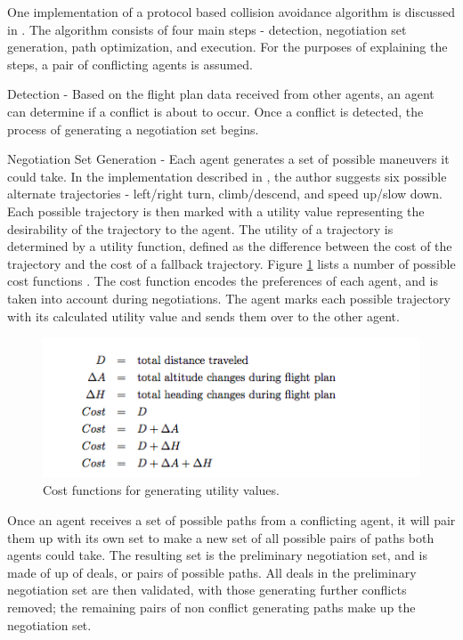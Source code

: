 \documentclass[conference]{IEEEtran}
\begin{document}
One implementation of a protocol based collision avoidance algorithm is discussed in \cite{vsivslak2008agentfly}. The algorithm consists of four main steps - detection, negotiation set generation, path optimization, and execution. For the purposes of explaining the steps, a pair of conflicting agents is assumed.

Detection - Based on the flight plan data received from other agents, an agent can determine if a conflict is about to occur. Once a conflict is detected, the process of generating a negotiation set begins.

Negotiation Set Generation -
Each agent generates a set of possible maneuvers it could take. In the implementation described in \cite{vsivslak2008agentfly}, the author suggests six possible alternate trajectories - left/right turn, climb/descend, and speed up/slow down. Each possible trajectory is then marked with a utility value representing the desirability of the trajectory to the agent. The utility of a trajectory is determined by a utility function, defined as the difference between the cost of the trajectory and the cost of a fallback trajectory. Figure \ref{fig:05Wollkind} lists a number of possible cost functions \cite{wollkind2004automated}. The cost function encodes the preferences of each agent, and is taken into account during negotiations. The agent marks each possible trajectory with its calculated utility value and sends them over to the other agent.  

\begin{figure}[h]
	\includegraphics [width=1\columnwidth] {05WollkindCost}
	\caption{Cost functions for generating utility values. \cite{wollkind2004automated}}
	\label{fig:05Wollkind}
\end{figure}


Once an agent receives a set of possible paths from a conflicting agent, it will pair them up with its own set to make a new set of all possible pairs of paths both agents could take.  The resulting set is the preliminary negotiation set, and is made of up of deals, or pairs of possible paths. All deals in the preliminary negotiation set are then validated, with those generating further conflicts removed; the remaining pairs of non conflict generating paths make up the negotiation set. 
\end{document}
